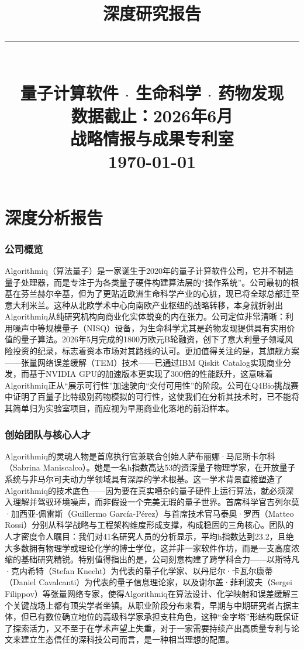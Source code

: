 \documentclass[11pt,a4paper]{ctexart}
\title{\vspace{2cm}{\Huge\bfseries\color{mainred} Algorithmiq\\[6pt] \mbox{算法量子}}\\[12pt]{\large 深度研究报告}\\[24pt]\rule{0.5\textwidth}{1.5pt}\\[16pt]{\large 量子计算软件 $\cdot$ 生命科学 $\cdot$ 药物发现}\\[8pt]{\footnotesize\color{graytext}数据截止：2026年6月}\\[8pt]{\large 战略情报与成果专利室}\\[16pt]{\large\color{graytext}\today}}
\date{}
\begin{document}
\maketitle\thispagestyle{empty}
\newpage\tableofcontents\newpage
\part{深度分析报告}
\section{公司概览}
Algorithmiq（算法量子）是一家诞生于2020年的量子计算软件公司，它并不制造量子处理器，而是专注于为各类量子硬件构建算法层的“操作系统”。公司最初的根基在芬兰赫尔辛基，但为了更贴近欧洲生命科学产业的心脏，现已将全球总部迁至意大利米兰。这种从北欧学术中心向南欧产业枢纽的战略转移，本身就折射出Algorithmiq从纯研究机构向商业化实体蜕变的内在张力。公司定位非常清晰：利用噪声中等规模量子（NISQ）设备，为生命科学尤其是药物发现提供具有实用价值的量子算法。2026年5月完成的1800万欧元B轮融资，创下了意大利量子领域风险投资的纪录，标志着资本市场对其路线的认可。更加值得关注的是，其旗舰方案——张量网络误差缓解（TEM）技术——已通过IBM Qiskit Catalog实现商业分发，而基于NVIDIA GPU的加速版本更实现了300倍的性能跃升，这意味着Algorithmiq正从“展示可行性”加速驶向“交付可用性”的阶段。公司在Q4Bio挑战赛中证明了百量子比特级别药物模拟的可行性，这使我们在分析其技术时，已不能将其简单归为实验室项目，而应视为早期商业化落地的前沿样本。

\section{创始团队与核心人才}
Algorithmiq的灵魂人物是首席执行官兼联合创始人萨布丽娜·马尼斯卡尔科（Sabrina Maniscalco）。她是一名h指数高达53的资深量子物理学家，在开放量子系统与非马尔可夫动力学领域具有深厚的学术根基。这一学术背景直接塑造了Algorithmiq的技术底色——因为要在真实嘈杂的量子硬件上运行算法，就必须深入理解并驾驭环境噪声，而非假设一个完美无瑕的量子世界。首席科学官吉列尔莫·加西亚-佩雷斯（Guillermo García-Pérez）与首席技术官马泰奥·罗西（Matteo Rossi）分别从科学战略与工程架构维度形成支撑，构成稳固的三角核心。团队的人才密度令人瞩目：我们对41名研究人员的分析显示，平均h指数达到23.2，且绝大多数拥有物理学或理论化学的博士学位，这并非一家软件作坊，而是一支高度浓缩的基础研究精锐。特别值得指出的是，公司刻意构建了跨学科合力——以斯特凡·克内希特（Stefan Knecht）为代表的量子化学家、以丹尼尔·卡瓦尔康蒂（Daniel Cavalcanti）为代表的量子信息理论家，以及谢尔盖·菲利波夫（Sergei Filippov）等张量网络专家，使得Algorithmiq在算法设计、化学映射和误差缓解三个关键战场上都有顶尖学者坐镇。从职业阶段分布来看，早期与中期研究者占据主体，但已有数位确立地位的高级科学家承担支柱角色，这种“金字塔”形结构既保证了探索活力，又不至于在学术声望上失重，对于一家需要持续产出高质量专利与论文来建立生态信任的深科技公司而言，是一种相当理想的配置。
\end{document}
